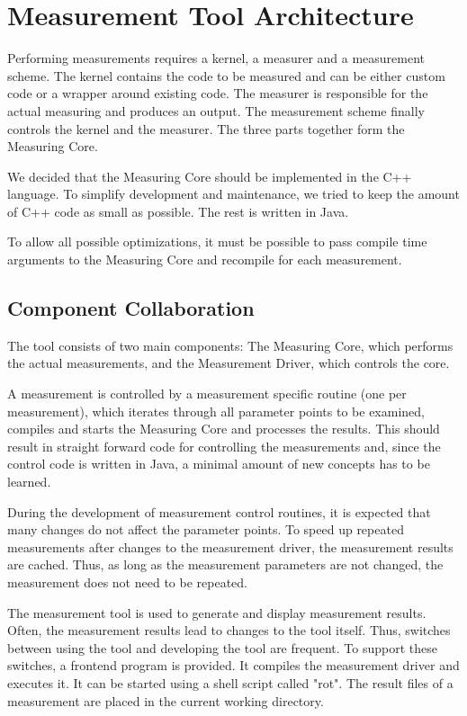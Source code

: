 \documentclass[a4paper,12pt]{article}
\begin{document}
\section{Measurement Tool Architecture}
Performing measurements requires a kernel, a measurer and a measurement scheme. The kernel contains the code to be measured and can be either custom code or a wrapper around existing code. The measurer is responsible for the actual measuring and produces an output. The measurement scheme finally controls the kernel and the measurer. The three parts together form the Measuring Core.

We decided that the Measuring Core should be implemented in the C++ language. To simplify development and maintenance, we tried to keep the amount of C++ code as small as possible. The rest is written in Java.

To allow all possible optimizations, it must be possible to pass compile time arguments to the Measuring Core and recompile for each measurement.

\subsection{Component Collaboration}
The tool consists of two main components: The Measuring Core, which performs the actual measurements, and the Measurement Driver, which controls the core.

A measurement is controlled by a measurement specific routine (one per measurement), which iterates through all parameter points to be examined, compiles and starts the Measuring Core and processes the results. This should result in straight forward code for controlling the measurements and, since the control code is written in Java, a minimal amount of new concepts has to be learned.

During the development of measurement control routines, it is expected that many changes do not affect the parameter points. To speed up repeated measurements after changes to the measurement driver, the measurement results are cached. Thus, as long as the measurement parameters are not changed, the measurement does not need to be repeated.

The measurement tool is used to generate and display measurement results. Often, the measurement results lead to changes to the tool itself. Thus, switches between using the tool and developing the tool are frequent. To support these switches, a frontend program is provided. It compiles the measurement driver and executes it. It can be started using a shell script called "rot". The result files of a measurement are placed in the current working directory.
\end{document}
